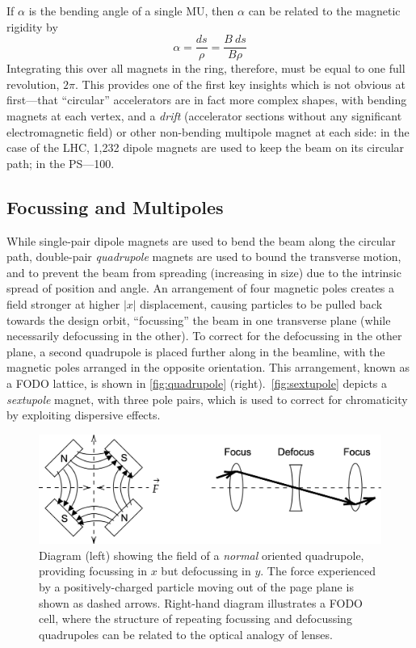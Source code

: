 \documentclass[a4paper,twoside,11pt]{report}
\begin{document}
If $\alpha$ is the bending angle of a single MU, then $\alpha$ can be related to the magnetic rigidity by
\begin{equation}
\alpha=\frac{ds}\rho=\frac{B\ ds}{B\rho}
\end{equation}
Integrating this over all magnets in the ring, therefore, must be equal to one full revolution, $2\pi$. This provides one of the first key insights which is not obvious at first---that ``circular'' accelerators are in fact more complex shapes, with bending magnets at each vertex, and a \textit{drift} (accelerator sections without any significant electromagnetic field) or other non-bending multipole magnet at each side: in the case of the LHC, 1,232 dipole magnets are used to keep the beam on its circular path; in the PS---100.

\subsection{Focussing and Multipoles}

While single-pair dipole magnets are used to bend the beam along the circular path, double-pair \textit{quadrupole} magnets are used to bound the transverse motion, and to prevent the beam from spreading (increasing in size) due to the intrinsic spread of position and angle. An arrangement of four magnetic poles creates a field stronger at higher $|x|$ displacement, causing particles to be pulled back towards the design orbit, ``focussing'' the beam in one transverse plane (while necessarily defocussing in the other). To correct for the defocussing in the other plane, a second quadrupole is placed further along in the beamline, with the magnetic poles arranged in the opposite orientation. This arrangement, known as a FODO lattice, is shown in \autoref{fig:quadrupole} (right).~\autoref{fig:sextupole} depicts a \textit{sextupole} magnet, with three pole pairs, which is used to correct for chromaticity by exploiting dispersive effects.

\begin{figure}
\centering
  \includegraphics*[width=0.9\linewidth]{fodo.png}
  \caption[Diagrams of a quadrupole magnetic field, and a FODO cell]{Diagram (left) showing the field of a \textit{normal} oriented quadrupole, providing focussing in $x$ but defocussing in $y$. The force experienced by a positively-charged particle moving out of the page plane is shown as dashed arrows. Right-hand diagram illustrates a FODO cell, where the structure of repeating focussing and defocussing quadrupoles can be related to the optical analogy of lenses.}\label{fig:quadrupole}
\end{figure}
\end{document}
